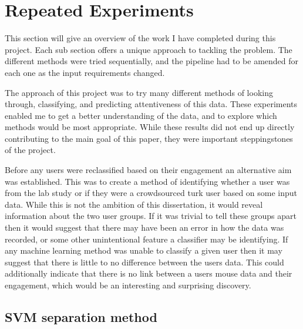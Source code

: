 \documentclass{article}
\begin{document}
\section{Repeated Experiments}


This section will give an overview of the work I have completed during this project.
Each sub section offers a unique approach to tackling the problem.
The different methods were tried sequentially, and the pipeline had to be amended for each one as the input requirements changed.

The approach of this project was to try many different methods of looking through, classifying, and predicting attentiveness of this data.
These experiments enabled me to get a better understanding of the data, and to explore which methods would be most appropriate.
While these results did not end up directly contributing to the main goal of this paper, they were important steppingstones of the project.

Before any users were reclassified based on their engagement an alternative aim was established.
This was to create a method of identifying whether a user was from the lab study or if they were a crowdsourced turk user based on some input data.
While this is not the ambition of this dissertation, it would reveal information about the two user groups.
If it was trivial to tell these groups apart then it would suggest that there may have been an error in how the data was recorded, or some other unintentional feature a classifier may be identifying.
If any machine learning method was unable to classify a given user then it may suggest that there is little to no difference between the users data.
This could additionally indicate that there is no link between a users mouse data and their engagement, which would be an interesting and surprising discovery. 


\subsection{SVM separation method}
\end{document}
